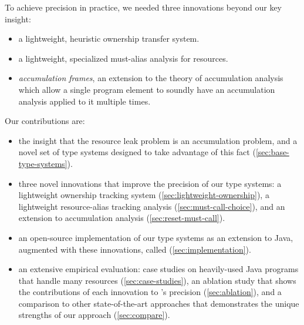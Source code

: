 To achieve precision in practice, we needed three
innovations beyond our key insight:
\begin{itemize}
\item a lightweight, heuristic ownership transfer system.
\item a lightweight, specialized must-alias analysis for resources.
\item \emph{accumulation frames}, an extension to the theory of
  accumulation analysis which allow a single program element to
  soundly have an accumulation analysis applied to it multiple times.
\end{itemize}

Our contributions are:
\begin{itemize}
\item the insight that the resource leak problem is an accumulation
  problem, and a novel set of type systems designed to take advantage
  of this fact (\cref{sec:base-type-systems}).
\item three novel innovations that improve the precision of our type
  systems: a lightweight ownership tracking system
  (\cref{sec:lightweight-ownership}), a lightweight resource-alias
  tracking analysis (\cref{sec:must-call-choice}), and an extension to
  accumulation analysis (\cref{sec:reset-must-call}).
\item an open-source implementation of our type systems as an extension to Java,
  augmented with these innovations, called \tool (\cref{sec:implementation}).
\item an extensive empirical evaluation: case studies on heavily-used
  Java programs that handle many resources (\cref{sec:case-studies}),
  an ablation study that shows the contributions of each innovation to
  \tool's precision (\cref{sec:ablation}), and a comparison to
  other state-of-the-art approaches that demonstrates the unique strengths
  of our approach (\cref{sec:compare}).
\end{itemize}
  
